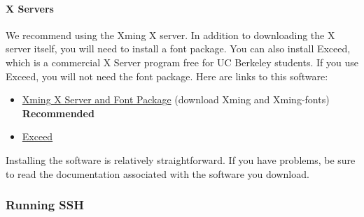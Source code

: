 \documentclass{article}
\begin{document}
\paragraph{X Servers} We recommend using the Xming X server. In addition to downloading the X server itself, you will need to install a font package. You can also install Exceed, which is a commercial X Server program free for UC Berkeley students. If you use Exceed, you will not need the font package. Here are links to this software:
\begin{itemize}
  \item \href{http://sourceforge.net/project/showfiles.php?group_id=156984}{Xming X Server and Font Package} (download Xming and Xming-fonts) \textbf{Recommended}
  \item \href{http://software-central.berkeley.edu/all/exceed}{Exceed}
\end{itemize}

Installing the software is relatively straightforward. If you have problems, be sure to read the documentation associated with the software you download.

\subsubsection{Running SSH}
\end{document}
